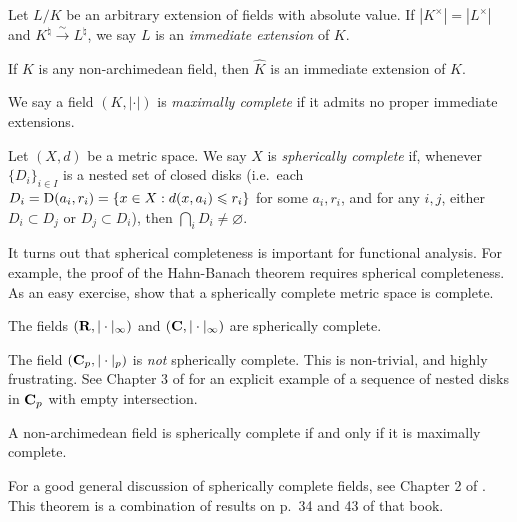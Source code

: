 \begin{definition}
Let $L/K$ be an arbitrary extension of fields with absolute value. If 
$|K^\times|=|L^\times|$ and $K^\natural\xrightarrow\sim L^\natural$, we say $L$ 
is an \emph{immediate extension} of $K$.  
\end{definition}

\begin{example}
If $K$ is any non-archimedean field, then $\widehat K$ is an immediate 
extension of $K$. 
\end{example}

\begin{definition}
We say a field $(K,|\cdot|)$ is \emph{maximally complete} if it admits no 
proper immediate extensions. 
\end{definition}

\begin{definition}
Let $(X,d)$ be a metric space. We say $X$ is \emph{spherically complete} if, 
whenever $\{D_i\}_{i\in I}$ is a nested set of closed disks (i.e.~each 
$D_i=\operatorname{D}(a_i,r_i)=\{x\in X:d(x,a_i)\leqslant r_i\}$ for some $a_i,r_i$, and 
for any $i,j$, either $D_i\subset D_j$ or $D_j\subset D_i$), then 
$\bigcap_i D_i\ne\varnothing$. 
\end{definition}

It turns out that spherical completeness is important for functional analysis. 
For example, the proof of the Hahn-Banach theorem requires spherical 
completeness. As an easy exercise, show that a spherically complete metric 
space is complete. 

\begin{example}
The fields $(\mathbf{R},|\cdot|_\infty)$ and $(\mathbf{C},|\cdot|_\infty)$ are spherically 
complete. 
\end{example}

\begin{example}
The field $(\mathbf{C}_p,|\cdot|_p)$ is \emph{not} spherically complete. This is 
non-trivial, and highly frustrating. See Chapter 3 of \cite{robert-2000} for an 
explicit example of a sequence of nested disks in $\mathbf{C}_p$ with empty 
intersection. 
\end{example}

\begin{theorem}
A non-archimedean field is spherically complete if and only if it is 
maximally complete. 
\end{theorem}

For a good general discussion of spherically complete fields, see Chapter 2 of 
\cite{narici-beckenstein-bachman}. This theorem is a combination of results on 
p.~34 and 43 of that book. 

